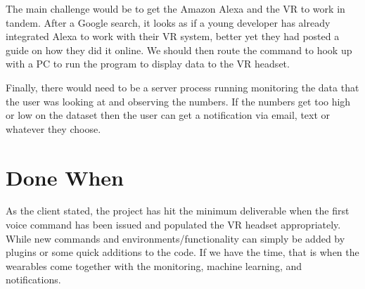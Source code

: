 \documentclass[onecolumn, draftclsnofoot,10pt, compsoc]{IEEEtran}
\begin{document}
The main challenge would be to get the Amazon Alexa and the VR to work in tandem. After a Google search, it looks as if a young developer has already integrated Alexa to work with their VR system, better yet they had posted a guide on how they did it online. We should then route the command to hook up with a PC to run the program to display data to the VR headset.



Finally, there would need to be a server process running monitoring the data that the user was looking at and observing the numbers. If the numbers get too high or low on the dataset then the user can get a notification via email, text or whatever they choose. 


\section{Done When}

As the client stated, the project has hit the minimum deliverable when the first voice command has been issued and populated the VR headset appropriately. While new commands and environments/functionality can simply be added by plugins or some quick additions to the code. If we have the time, that is when the wearables come together with the monitoring, machine learning, and notifications.
\end{document}
